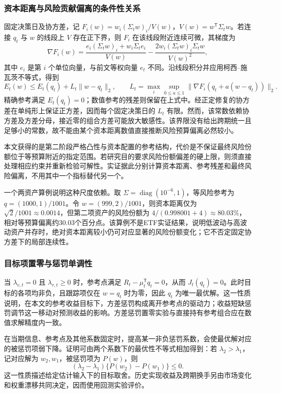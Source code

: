 \subsubsection{资本距离与风险贡献偏离的条件性关系}
\label{sec:tracking_risk_bound}
固定决策日及协方差，记 $F_i(w)=w_i(\Sigma_t w)_i/V(w)$，$V(w)=w^\mathsf T\Sigma_t w$。若连接 $q_t$ 与 $w$ 的线段上 $V$ 存在正下界，则 $F_i$ 在该线段附近连续可微，其梯度为
\[
\nabla F_i(w)=\frac{e_i(\Sigma_t w)_i+w_i\Sigma_t e_i}{V(w)}
-\frac{2w_i(\Sigma_t w)_i\Sigma_t w}{V(w)^2},
\]
其中 $e_i$ 是第 $i$ 个单位向量，与前文等权向量 $e_t$ 不同。沿线段积分并应用柯西--施瓦茨不等式，得到
\[
E_t(w)\leq E_t(q_t)+L_t\|w-q_t\|_2,\qquad
L_t=\max_i\sup_{0\leq a\leq1}
\|\nabla F_i(q_t+a(w-q_t))\|_2.
\]
精确参考满足 $E_t(q_t)=0$；数值参考的残差则保留在上式中。经正定修复的协方差在单纯形上保证正方差，因而每个固定决策日的 $L_t$ 有限。然而，该常数依赖协方差及方差分母，接近零的组合方差可能放大敏感性。该界限没有给出跨期统一且足够小的常数，故不能由某个资本距离数值直接推断风险预算偏离必然较小。

本文获得的是第二阶段严格凸性与资本配置的参考结构，代价是不保证最终风险份额位于等预算附近的指定范围。若研究目的要求风险份额偏差的硬上限，则须直接处理相应约束并重新检验可解性。实证据此分别计算资本距离、参考残差和最终风险偏离，不用其中一个指标替代另一个。

一个两资产算例说明这种尺度依赖。取 $\Sigma=\operatorname{diag}(10^{-6},1)$，等风险参考为 $q=(1000,1)/1001$。令 $w=(999,2)/1001$，则资本距离仅为 $\sqrt{2}/1001\approx0.0014$，但第二项资产的风险份额为 $4/(0.998001+4)\approx80.03\%$，相对等预算偏离约30.03个百分点。该算例不是ETF实证结果，说明低波动与高波动资产并存时，绝对资本距离较小仍可对应显著的风险份额变化；它不否定固定协方差下的局部连续性。

\subsubsection{目标项置零与惩罚单调性}

当 $\lambda_{v,t}=0$ 且 $\lambda_{r,t}\geq0$ 时，参考点满足
$R_t-\mu_t^\mathsf Tq_t=0$，从而 $J_t(q_t)=0$。此时目标的各项均非负，且跟踪项仅在 $w=q_t$ 时为零，因此 $q_t$ 为唯一最优解。这一性质说明，在本文的参考收益目标下，方差惩罚构成离开参考点的驱动力；收益短缺惩罚调节这一移动对预测收益的影响。方差惩罚置零实验与直接持有参考组合应在数值求解精度内一致。

在当期信息、参考点及其他系数固定时，提高某一非负惩罚系数，会使最优解对应的被惩罚项弱下降。证明可由两个系数下的最优性不等式相加得到：若 $\lambda_2>\lambda_1$，记对应解为 $w_2,w_1$，被惩罚项为 $P(w)$，则
\[
(\lambda_2-\lambda_1)\{P(w_2)-P(w_1)\}\leq0.
\]
这一性质描述给定估计输入下的目标取舍。历史实现收益及跨期换手另由市场变化和权重漂移共同决定，因而使用回测实验评价。

